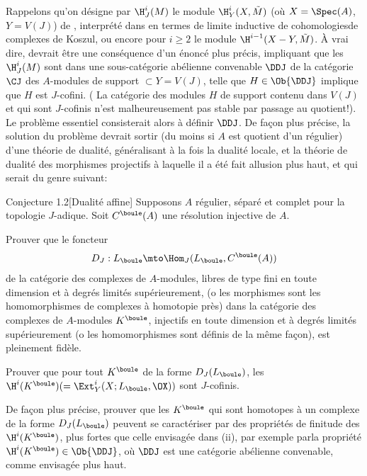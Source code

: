 Rappelons qu'on d\'esigne par $\H^i_J (M)$ le module $\H^i_Y (X, \tilde{M})$ (o\`u $X=\Spec (A)$, $Y=V(J)$) de \Exp {}, interpr\'et\'e dans  en termes de limite inductive de cohomologies\pageoriginale de complexes de Koszul, ou encore pour $i\ge 2$ le module $\H^{i-1} (X-Y, \tilde{M})$. À vrai dire,  devrait \^etre une cons\'equence d'un \'enonc\'e plus pr\'ecis, impliquant que les $\H^i_J ({M})$ sont dans une sous-cat\'egorie ab\'elienne convenable ${\DDJ}$ de la cat\'egorie ${\CJ}$ des $A$-modules de support $\subset Y=V(J)$, telle que $H\in \Ob {\DDJ}$ implique que $H$ est $J$-cofini. ( La cat\'egorie des modules $H$ de support contenu dans $V(J)$ et qui sont $J$-cofinis n'est malheureusement pas stable par passage au quotient!). Le probl\`eme essentiel consisterait alors \`a d\'efinir ${\DDJ}$. De fa\c con plus pr\'ecise, la solution du probl\`eme  devrait sortir (du moins si $A$ est quotient d'un r\'egulier) d'une th\'eorie de dualit\'e, g\'en\'eralisant \`a la fois la dualit\'e locale, et la th\'eorie de dualit\'e des morphismes projectifs \`a laquelle il a \'et\'e fait allusion plus haut, et qui serait du genre suivant:

 \label{XIII.1.2}
\begin{enonce*}{Conjecture 1.2}[\og Dualit\'e affine\fg\sfootnotemark]
 Supposons $A$ r\'egulier, s\'epar\'e et complet pour la topologie $J$-adique. Soit $C^{\boule}(A)$ une r\'esolution injective de $A$.
\begin{enumeratei}
\item
Prouver que le foncteur
$$D_J: L_{\boule}\mto \Hom_J(L_{\boule}, C^{\boule}(A))$$
de la cat\'egorie des complexes de $A$-modules, libres de type fini en toute dimension et \`a degr\'es limit\'es sup\'erieurement, (o les morphismes sont les homomorphismes de complexes \`a homotopie pr\`es) dans la cat\'egorie des complexes de $A$-modules $K^{\boule}$, injectifs en toute dimension et \`a degr\'es limit\'es sup\'erieurement (o les homomorphismes sont d\'efinis de la m\^eme fa\c con), est pleinement fid\`ele.

\item
Prouver que pour tout $K^{\boule}$ de la forme $D_J(L_{\boule})$, les $\H^i(K^{\boule})(= \Ext_Y^i (X; L_{\boule}, \OX))$ sont $J$-cofinis.

\item
De fa\c con plus pr\'ecise, prouver que les $K^{\boule}$ qui sont homotopes \`a un complexe de la forme $D_J(L_{\boule})$ peuvent se caract\'eriser par des propri\'et\'es de finitude des $\H^i(K^{\boule})$, plus fortes que celle envisag\'ee dans (ii), par exemple par\pageoriginale la propri\'et\'e $\H^i(K^{\boule})\in \Ob {\DDJ}$, o\`u ${\DDJ}$ est une cat\'egorie ab\'elienne convenable, comme envisag\'ee plus haut.
\end{enumeratei}
\end{enonce*}


